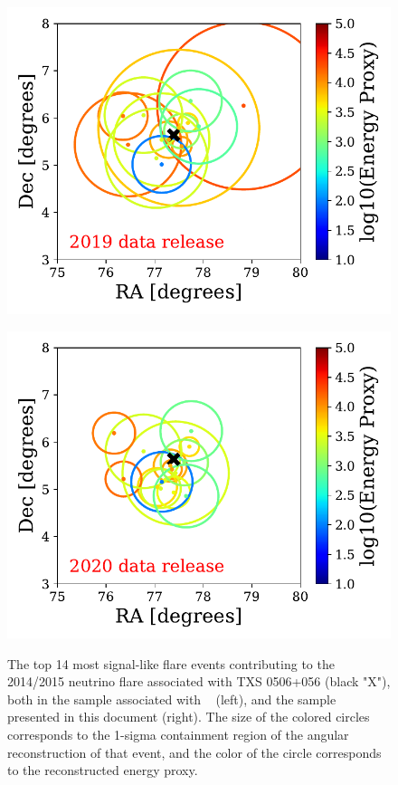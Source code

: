 \documentclass[aps,10pt,prd,twocolumn,floats,letterpaper,showpacs,nofootinbib,bibnotes,notitlepage,superscriptaddress,floatfix]{revtex4-1}
\begin{document}
\begin{figure}[t]
\centering
\begin{minipage}{.5\textwidth}
  \centering
  \includegraphics[width=.95\linewidth]{./TXSCheckPlots/PSTracksv2evtplot.pdf}
  \label{fig:test1}
\end{minipage}\hfill
\begin{minipage}{.5\textwidth}
  \includegraphics[width=.95\linewidth]{./TXSCheckPlots/PSTracksv3evtplot.pdf}
  \label{fig:test2}
\end{minipage}
\caption[]{The top 14 most signal-like flare events contributing to the 2014/2015 neutrino flare associated with TXS 0506+056 (black "X"), both in the sample associated with ~\cite{IceCube:2019} (left), and the sample presented in this document (right). The size of the colored circles corresponds to the 1-sigma containment region of the angular reconstruction of that event, and the color of the circle corresponds to the reconstructed energy proxy.}\label{fig:TXSEvtsCompare}
\end{figure}
\end{document}

